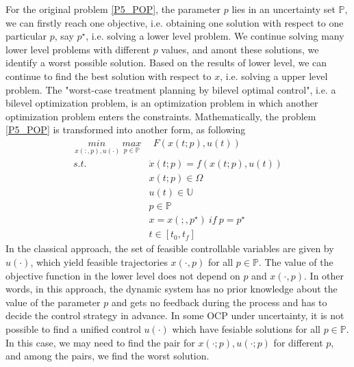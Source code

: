 \documentclass  [
  paper    = a4,
  BCOR     = 10mm,
  twoside,
  fontsize = 12pt,
  fleqn,
  toc      = bibnumbered,
  toc      = listofnumbered,
  numbers  = noendperiod,
  headings = normal,
  listof   = leveldown,
  version  = 3.03
]                                       {scrreprt}
\newcommand{\<}{\langle}
\renewcommand{\>}{\rangle}
\begin{document}
For the original problem \ref{P5_POP}, the parameter $p$ lies in an uncertainty set $ \mathbb{P}$, we can firstly reach one objective, i.e. obtaining one solution with respect to one particular $p$, say $p^\star$, i.e. solving a lower level problem. We continue solving many lower level problems with different $p$ values, and amont these solutions, we identify a worst possible solution.  Based on the results of lower level, we can continue to find the best solution with respect to $x$, i.e. solving a upper level problem. The "worst-case treatment planning by bilevel optimal control", i.e. a  bilevel optimization problem, is an optimization problem in which another optimization problem enters the constraints. Mathematically, the problem \ref{P5_POP} is transformed into another form,  as following
\begin{equation}
	\begin{aligned}
		\underset{\ x(:,p), u(\cdot)}{min} \   \underset{p  \in   \mathbb{P} }{max} & \ \ F(x(t;p), u(t)) \\ 
	s.t.\ \  &  \dot{x} (t;p) = f(x(t;p), u(t))\\ 
& x(t;p) \in \Omega \\
& u(t) \in \mathbb{U}  \\
& p  \in   \mathbb{P}  \\
& x = x(;,p^\star) \ if \ p = p^\star \\
& t \in [t_0, t_f]
	\end{aligned}
	\label{minmax}
\end{equation}
In the classical approach, the set of feasible controllable variables are given by $u(\cdot)$, which yield feasible trajectories $x(\cdot, p)$ for all $p  \in   \mathbb{P}$. The value of the objective function in the lower level does not depend on $p$ and $x(\cdot, p)$. In other words, in this approach, the dynamic system has no prior knowledge about the value of the parameter $p$ and gets no feedback during the process and has to decide the control strategy in advance.  In some OCP under uncertainty, it is not possible to find a unified control $u(\cdot)$ which have fesiable solutions for all $p  \in   \mathbb{P}$. In this case, we may need to find the pair for $x(\cdot;p), u(\cdot;p)$ for different $p$, and among the pairs, we find the worst solution.
\end{document}
